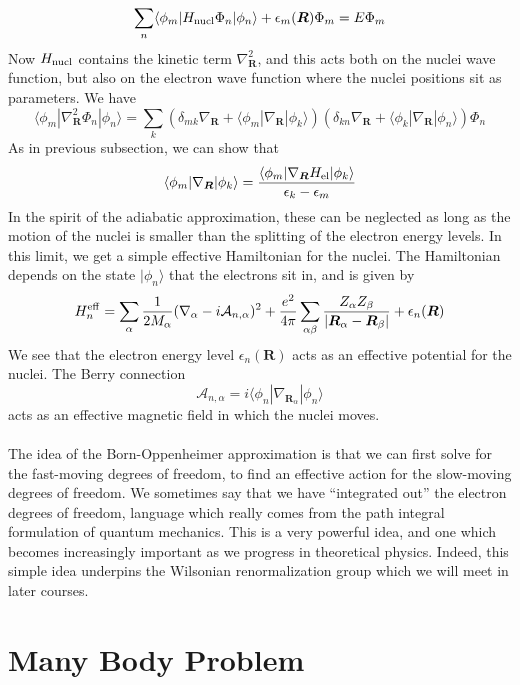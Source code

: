 \[\sum_n \langle \phi_m | H_{\rm nucl} \Phi_n | \phi_n \rangle + \epsilon_m(\bm{R}) \Phi_m = E\Phi_m\]
Now $H_{\rm nucl}$ contains the kinetic term $\nabla^2_{\bm{R}}$, and this acts both on the nuclei wave function, but also on the electron wave function where the nuclei positions sit as parameters. We have
\[\langle \phi_m | \nabla^2_{\bm{R}} \Phi_n | \phi_n \rangle = \sum_k \left(\delta_{mk} \nabla_{\bm{R}} + \langle \phi_m | \nabla_{\bm{R}} | \phi_k \rangle  \right) \left(\delta_{kn} \nabla_{\bm{R}} + \langle \phi_k | \nabla_{\bm{R}} | \phi_n \rangle  \right) \Phi_n\]
As in previous subsection, we can show that
\[\langle \phi_m | \nabla_{\bm{R}} | \phi_k \rangle = \frac{\langle \phi_m | \nabla_{\bm{R}} H_{\rm el} | \phi_k\rangle}{\epsilon_k - \epsilon_m}\]
In the spirit of the adiabatic approximation, these can be neglected as long as the motion of the nuclei is smaller than the splitting of the electron energy levels.
In this limit, we get a simple effective Hamiltonian for the nuclei. The Hamiltonian depends on the state $|\phi_n\rangle$ that the electrons sit in, and is given by
\[H_n^{\rm eff} = \sum_{\alpha} \frac{1}{2M_{\alpha}} (\nabla_{\alpha} - i\mathcal{A}_{n,\alpha})^2 + \frac{e^2}{4\pi}\sum_{\alpha \beta} \frac{Z_{\alpha} Z_{\beta}}{|\bm{R}_{\alpha} - \bm{R}_{\beta}|} + \epsilon_n(\bm{R}) \]
We see that the electron energy level $\epsilon_n(\bm{R})$ acts as an effective potential for the nuclei. The Berry connection
\[\mathcal{A}_{n,\alpha} = i \langle \phi_n | \nabla_{\bm{R}_{\alpha}} | \phi_n \rangle\]
acts as an effective magnetic field in which the nuclei
moves.
\\ \\
The idea of the Born-Oppenheimer approximation is that we can first solve for the fast-moving degrees of freedom, to find an effective action for the slow-moving degrees
of freedom. We sometimes say that we have ``integrated out'' the electron degrees of freedom, language which really comes from the path integral formulation of quantum mechanics. 
This is a very powerful idea, and one which becomes increasingly important as we progress in theoretical physics. Indeed, this simple idea underpins the Wilsonian
renormalization group which we will meet in later courses.

\chapter{Many Body Problem}
